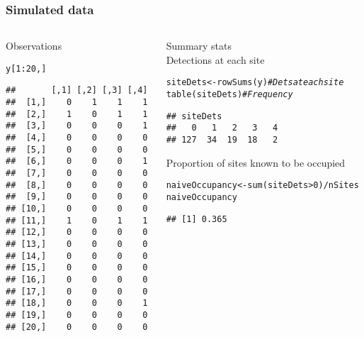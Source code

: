 \documentclass[color=usenames,dvipsnames]{beamer}\usepackage[]{graphicx}\usepackage[]{xcolor}
\makeatletter
\newcommand{\hlnum}[1]{\textcolor[rgb]{0.69,0.494,0}{#1}}%
\newcommand{\hlcom}[1]{\textcolor[rgb]{0.514,0.506,0.514}{\textit{#1}}}%
\newcommand{\hlopt}[1]{\textcolor[rgb]{0,0,0}{#1}}%
\newcommand{\hldef}[1]{\textcolor[rgb]{0,0,0}{#1}}%
\newcommand{\hlkwb}[1]{\textcolor[rgb]{0,0.341,0.682}{#1}}%
\newcommand{\hlkwd}[1]{\textcolor[rgb]{0.004,0.004,0.506}{#1}}%
\newenvironment{kframe}{%
 \def\at@end@of@kframe{}%
 \ifinner\ifhmode%
  \def\at@end@of@kframe{\end{minipage}}%
  \begin{minipage}{\columnwidth}%
 \fi\fi%
 \def\FrameCommand##1{\hskip\@totalleftmargin \hskip-\fboxsep
 \colorbox{shadecolor}{##1}\hskip-\fboxsep
     \hskip-\linewidth \hskip-\@totalleftmargin \hskip\columnwidth}%
 \MakeFramed {\advance\hsize-\width
   \@totalleftmargin\z@ \linewidth\hsize
   \@setminipage}}%
 {\par\unskip\endMakeFramed%
 \at@end@of@kframe}
\newenvironment{knitrout}{}{} %
\makeatother
\begin{document}
\begin{frame}[fragile]
  \frametitle{Simulated data}
  \begin{columns}
    \begin{column}{0.4\textwidth}
      \small
      Observations
\begin{knitrout}\scriptsize
{}\color{fgcolor}\begin{kframe}
\begin{alltt}
\hldef{y[}\hlnum{1}\hlopt{:}\hlnum{20}\hldef{,]}
\end{alltt}
\begin{verbatim}
##       [,1] [,2] [,3] [,4]
##  [1,]    0    1    1    1
##  [2,]    1    0    1    1
##  [3,]    0    0    0    1
##  [4,]    0    0    0    0
##  [5,]    0    0    0    0
##  [6,]    0    0    0    1
##  [7,]    0    0    0    0
##  [8,]    0    0    0    0
##  [9,]    0    0    0    0
## [10,]    0    0    0    0
## [11,]    1    0    1    1
## [12,]    0    0    0    0
## [13,]    0    0    0    0
## [14,]    0    0    0    0
## [15,]    0    0    0    0
## [16,]    0    0    0    0
## [17,]    0    0    0    0
## [18,]    0    0    0    1
## [19,]    0    0    0    0
## [20,]    0    0    0    0
\end{verbatim}
\end{kframe}
\end{knitrout}
  \end{column}
  \begin{column}{0.6\textwidth}
    \pause
    {\centering Summary stats \\}
  Detections at each site \\
\begin{knitrout}\scriptsize
{}\color{fgcolor}\begin{kframe}
\begin{alltt}
\hldef{siteDets} \hlkwb{<-} \hlkwd{rowSums}\hldef{(y)} \hlcom{# Dets at each site}
\hlkwd{table}\hldef{(siteDets)}        \hlcom{# Frequency}
\end{alltt}
\begin{verbatim}
## siteDets
##   0   1   2   3   4 
## 127  34  19  18   2
\end{verbatim}
\end{kframe}
\end{knitrout}
\pause
\vfill
\small
Proportion of sites known to be occupied \\
\begin{knitrout}\scriptsize
{}\color{fgcolor}\begin{kframe}
\begin{alltt}
\hldef{naiveOccupancy} \hlkwb{<-} \hlkwd{sum}\hldef{(siteDets}\hlopt{>}\hlnum{0}\hldef{)}\hlopt{/}\hldef{nSites}
\hldef{naiveOccupancy}
\end{alltt}
\begin{verbatim}
## [1] 0.365
\end{verbatim}
\end{kframe}
\end{knitrout}


\end{column}
\end{columns}
\end{frame}
\end{document}
